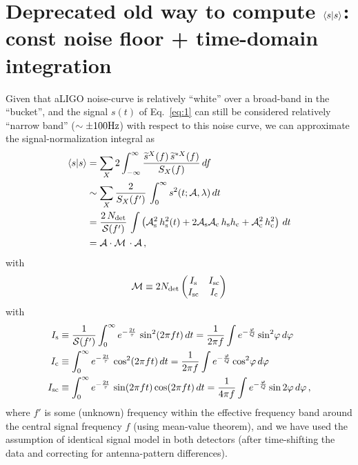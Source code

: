 \documentclass[aps,prd,onecolumn,notitlepage,nofootinbib,superscriptaddress,altaffilletter,floatfix]{revtex4-1}
\begin{document}
\newpage
\appendix

\section{Deprecated old way to compute $\left\langle s\middle|s\right\rangle$: const noise floor + time-domain integration}
\label{sec:depr-first-way}

Given that aLIGO noise-curve is relatively ``white'' over a broad-band in the ``bucket'', and the signal $s(t)$ of Eq.~\eqref{eq:1} can still be
considered relatively ``narrow band'' ($\sim \pm 100\mathrm{Hz}$) with respect to this noise curve, we can approximate the signal-normalization integral as
\begin{align}
  \label{eq:17}
  \left\langle s\middle|s\right\rangle &= \sum_X 2 \int_{-\infty}^{\infty} \frac{\widetilde{s}^X(f)\,\widetilde{s}^{*X}(f)}{S_X(f)}\,d f\\
  &\sim \sum_X \frac{2}{S_X(f')} \, \int_{0}^{\infty} s^2(t;{\mathcal A},\lambda)\,dt\\
  & = \frac{2\,N_{\mathrm{det}}}{\mathcal{S}(f')} \,\int \left( {\mathcal A}_{\mathrm{s}}^2\,h_\mathrm{s}^2(t) + 2{\mathcal A}_{\mathrm{s}}{\mathcal A}_{\mathrm{c}}\,h_\mathrm{s}h_\mathrm{c} + {\mathcal A}_{\mathrm{c}}^2\,h_\mathrm{c}^2\right)\,d t\\
  & = {\mathcal A} \cdot \mathcal{M} \,\cdot{\mathcal A}\,,
\end{align}
with
\begin{equation}
  \label{eq:23}
  \mathcal{M} \equiv
  2N_{\mathrm{det}} \begin{pmatrix}
    I_{\mathrm{s}}  & I_{\mathrm{sc}} \\
    I_{\mathrm{sc}}  & I_{\mathrm{c}}\\
  \end{pmatrix}
\end{equation}
with
\begin{align}
  \label{eq:43}
  I_{\mathrm{s}}  &\equiv \frac{1}{\mathcal{S}(f')}\int_0^\infty e^{-\frac{2t}{\tau}}\,\sin^2(2\pi f t)\,dt = \frac{1}{2\pi f}\int e^{-\frac{\varphi}{Q}} \sin^2\!\varphi\,d\varphi\\
  I_{\mathrm{c}}  &\equiv \int_0^\infty e^{-\frac{2t}{\tau}}\,\cos^2(2\pi f t)\,dt = \frac{1}{2\pi f}\int e^{-\frac{\varphi}{Q}} \cos^2\!\varphi\,d\varphi\\
  I_{\mathrm{sc}} &\equiv \int_0^\infty e^{-\frac{2t}{\tau}}\,\sin(2\pi f t)\cos(2\pi f t)\,dt = \frac{1}{4\pi f}\int e^{-\frac{\varphi}{Q}} \sin2\varphi\,d\varphi\,,
\end{align}
where $f'$ is some (unknown) frequency within the effective frequency band around the central signal frequency $f$ (using mean-value theorem), and we
have used the assumption of identical signal model in both detectors (after time-shifting the data and correcting for antenna-pattern differences).
\end{document}
